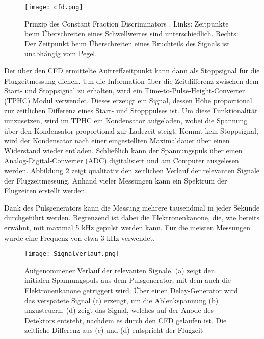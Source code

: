 \begin{figure}
    \centering
    \texttt{[image: cfd.png]}
    \caption[Prinzip des Constant Fraction Discriminators]{Prinzip des Constant Fraction Discriminators \cite{CFD}. Links: Zeitpunkte beim Überschreiten eines Schwellwertes sind unterschiedlich. Rechts: Der Zeitpunkt beim Überschreiten eines Bruchteils des Signals ist unabhängig vom Pegel.\\}
    \label{fig:CFD} 
\end{figure}

Der über den CFD ermittelte Auftreffzeitpunkt kann dann als Stoppsignal für die Flugzeitmessung dienen. Um die Information über die Zeitdifferenz zwischen dem Start- und Stoppsignal zu erhalten, wird ein Time-to-Pulse-Height-Converter (TPHC) Modul verwendet. Dieses erzeugt ein Signal, dessen Höhe proportional zur zeitlichen Differenz eines Start- und Stopppulses ist. Um diese Funktionalität umzusetzen, wird im TPHC ein Kondensator aufgeladen, wobei die Spannung über den Kondensator proportional zur Ladezeit steigt. Kommt kein Stoppsignal, wird der Kondensator nach einer eingestellten Maximaldauer über einen Widerstand wieder entladen. Schließlich kann der Spannungspuls über einen Analog-Digital-Converter (ADC) digitalisiert und am Computer ausgelesen werden. Abbildung \ref{fig:Signal} zeigt qualitativ den zeitlichen Verlauf der relevanten Signale der Flugzeitmessung. Anhand vieler Messungen kann ein Spektrum der Flugzeiten erstellt werden.

Dank des Pulsgenerators kann die Messung mehrere tausendmal in jeder Sekunde durchgeführt werden. Begrenzend ist dabei die Elektronenkanone, die, wie bereits erwähnt, mit maximal 5 kHz gepulst werden kann. Für die meisten Messungen wurde eine Frequenz von etwa 3 kHz verwendet.

\begin{figure}
    \centering
    \texttt{[image: Signalverlauf.png]}
    \caption[Aufgenommener Verlauf der relevanten Signale der ToF-Messung]{Aufgenommener Verlauf der relevanten Signale. (a) zeigt den initialen Spannungspuls aus dem Pulsgenerator, mit dem auch die Elektronenkanone getriggert wird. Über einen Delay-Generator wird das verspätete Signal (c) erzeugt, um die Ablenkspannung (b) anzusteuern. (d) zeigt das Signal, welches auf der Anode des Detektors entsteht, nachdem es durch den CFD gelaufen ist. Die zeitliche Differenz aus (c) und (d) entspricht der Flugzeit}
    \label{fig:Signal} 
\end{figure}


